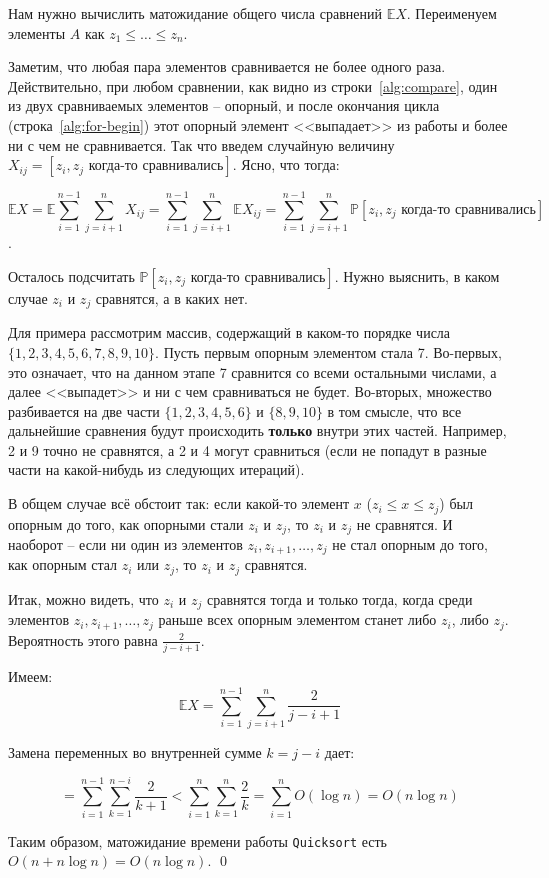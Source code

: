 Нам нужно вычислить матожидание общего числа сравнений $\mathbb E X$. Переименуем элементы $A$ как $z_1 \leq \ldots \leq z_n$.

Заметим, что любая пара элементов сравнивается не более одного раза. Действительно, при любом сравнении, как видно из строки~\ref{alg:compare}, один из двух сравниваемых элементов -- опорный, и после окончания цикла (строка~\ref{alg:for-begin}) этот опорный элемент <<выпадает>> из работы и более ни с чем не сравнивается. Так что введем случайную величину $X_{ij} = [z_i, z_j \text{ когда-то сравнивались}]$. Ясно, что тогда:

$$\mathbb E X = \mathbb E \sum_{i=1}^{n-1} \sum_{j=i+1}^n X_{ij} = \sum_{i=1}^{n-1} \sum_{j=i+1}^n \mathbb E X_{ij} = \sum_{i=1}^{n-1} \sum_{j=i+1}^n \mathbb P[z_i, z_j \text{ когда-то сравнивались}]$$.

Осталось подсчитать $\mathbb P[z_i, z_j\text{ когда-то сравнивались}]$. Нужно выяснить, в каком случае $z_i$ и $z_j$ сравнятся, а в каких нет.

Для примера рассмотрим массив, содержащий в каком-то порядке числа $\{1,2,3,4,5,6,7,8,9,10\}$. Пусть первым опорным элементом стала 7. Во-первых, это означает, что на данном этапе 7 сравнится со всеми остальными числами, а далее <<выпадет>> и ни с чем сравниваться не будет. Во-вторых, множество разбивается на две части $\{1,2,3,4,5,6\}$ и $\{8,9,10\}$ в том смысле, что все дальнейшие сравнения будут происходить \textbf{только} внутри этих частей. Например, 2 и 9 точно не сравнятся, а 2 и 4 могут сравниться (если не попадут в разные части на какой-нибудь из следующих итераций).

В общем случае всё обстоит так: если какой-то элемент $x$ ($z_i \leq x \leq z_j$) был опорным до того, как опорными стали $z_i$ и $z_j$, то $z_i$ и $z_j$ не сравнятся. И наоборот -- если ни один из элементов $z_i, z_{i+1},\ldots, z_j$ не стал опорным до того, как опорным стал $z_i$ или $z_j$, то $z_i$ и $z_j$ сравнятся.

Итак, можно видеть, что $z_i$ и $z_j$ сравнятся тогда и только тогда, когда среди элементов $z_i, z_{i+1}, \ldots, z_j$ раньше всех опорным элементом станет либо $z_i$, либо $z_j$. Вероятность этого равна $\frac{2}{j-i+1}$.

Имеем: $$\mathbb E X = \sum_{i=1}^{n-1} \sum_{j=i+1}^n \frac{2}{j-i+1}$$

Замена переменных во внутренней сумме $k = j-i$ дает:

$$ = \sum_{i=1}^{n-1} \sum_{k=1}^{n-i} \frac{2}{k+1} < \sum_{i=1}^n \sum_{k=1}^n \frac{2}{k} = \sum_{i=1}^n O(\log n) = O(n \log n)$$

Таким образом, матожидание времени работы \texttt{Quicksort} есть $O(n+n\log n) = O(n\log n)$. \qed
